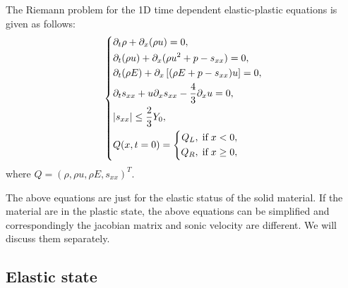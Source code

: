 \documentclass{article}
\numberwithin{equation}{section}
\numberwithin{table}{section}
\begin{document}
The Riemann problem for the 1D time dependent elastic-plastic equations is given as follows:
 \begin{equation}\label{eq:1d}
   \left\{ \begin{aligned}
       & \partial _t \rho +\partial_x(\rho u)=0,\\
       & \partial _t (\rho u)+\partial_x(\rho u^2 + p -s_{xx})=0,\\
       &\partial _t (\rho E)+\partial_x\left[(\rho E + p -s_{xx})u\right]=0,\\
       &\partial _t s_{xx}+u\partial_xs_{xx}-\frac{4}{3}\partial_x u=0,\\
& |s_{xx}|\leq \frac{2}{3}Y_{0}, \\
       &Q(x,t = 0) = \left\{\begin{aligned}
           Q_L, \hspace{0.1cm} \text{if} \hspace{0.1cm} x<0, \\
           Q_R, \hspace{0.1cm} \text{if} \hspace{0.1cm} x\ge 0, \\
       \end{aligned}\right.
     \end{aligned}
  \right.
\end{equation}
where $Q = (\rho, \rho u, \rho E, s_{xx})^T$.


The above equations are just for the elastic status of the solid material.
If the material are in the plastic state, the above equations can be simplified
and correspondingly the jacobian matrix and sonic velocity are different.
We will discuss them separately.
\subsection{Elastic state}
\end{document}
